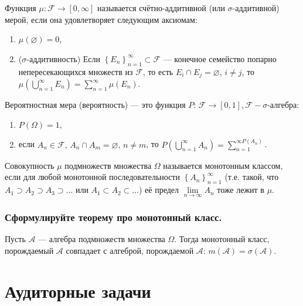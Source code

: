 Функция $ \mu: \mathcal{F} \rightarrow \left[ 0, \infty \right] $ называется счётно-аддитивной (или $ \sigma $-аддитивной) мерой, если она удовлетворяет следующим аксиомам:
\begin{enumerate}
\item $ \mu \left( \varnothing \right) = 0$,
\item ($ \sigma $-аддитивность) Если
$ \left\{ E_n \right\}_{n=1}^{ \infty } \subset \mathcal{F}$
--- конечное семейство попарно непересекающихся множеств из
$ \mathcal{F}$, то есть $E_i \cap E_j = \varnothing, \, i \neq j$,
то $ \mu \left( \bigcup \limits_{n=1}^{ \infty } E_n \right) = \sum \limits_{n=1}^{ \infty } \mu \left( E_n \right)$.
\end{enumerate}

Вероятностная мера (вероятность) --- это функция $P: \, \mathcal{F} \rightarrow \left[ 0, 1 \right], \mathcal{F} - \sigma $-алгебра:
\begin{enumerate}
\item $P \left( \Omega \right) = 1$,
\item если
$A_n \in \mathcal{F}, \,
A_n \cap A_m = \varnothing, \,
n \neq m$, то $P \left( \bigcup \limits_{n=1}^{ \infty } A_n \right) = \sum \limits_{n=1}^{ \infty  P \left( A_n \right) }$.
\end{enumerate}

Совокупность $ \mu $ подмножеств множества $ \Omega $ называется монотонным классом,
если для любой монотонной последовательности $ \left\{ A_n \right\}_{n=1}^{ \infty } $
(т.е. такой,
что $A_1 \supset A_2 \supset A_3 \supset \dotsc $ или $A_1 \subset A_2 \subset \dotsc $) её предел $ \lim \limits_{n \rightarrow \infty } A_n$ тоже лежит в $ \mu $.

\subsubsection*{Сформулируйте теорему про монотонный класс.}

Пусть $ \mathcal{A}$ --- алгебра подмножеств множества $ \Omega $.
Тогда монотонный класс, порождаемый $ \mathcal{A}$ совпадает с алгеброй, порождаемой $ \mathcal{A}: \, m \left( \mathcal{A} \right) = \sigma \left( \mathcal{A} \right) $.

\section*{Аудиторные задачи}

